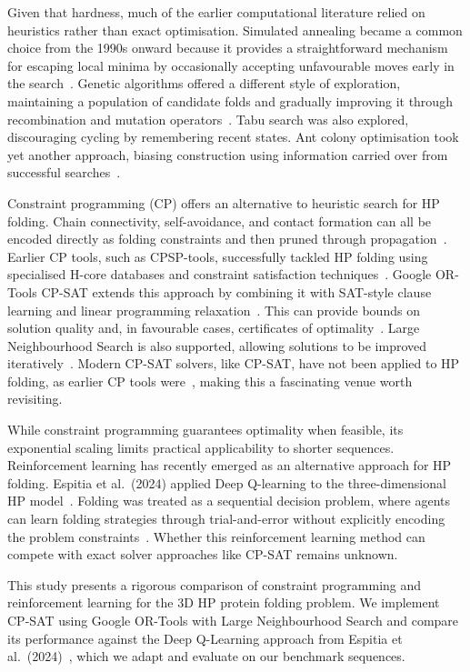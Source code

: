 \documentclass{article}
\theoremstyle{plain}
\theoremstyle{definition}
\begin{document}
Given that hardness, much of the earlier computational literature relied on heuristics rather than exact optimisation. Simulated annealing became a common choice from the 1990s onward because it provides a straightforward mechanism for escaping local minima by occasionally accepting unfavourable moves early in the search~\cite{UngerMoult1993}. Genetic algorithms offered a different style of exploration, maintaining a population of candidate folds and gradually improving it through recombination and mutation operators~\cite{Krasnogor2002Multimeme}. Tabu search was also explored, discouraging cycling by remembering recent states. Ant colony optimisation took yet another approach, biasing construction using information carried over from successful searches~\cite{LeshPullMoves2003, StützleACO2005}.

Constraint programming (CP) offers an alternative to heuristic search for HP folding. Chain connectivity, self-avoidance, and contact formation can all be encoded directly as folding constraints and then pruned through propagation~\cite{Barták2003}. Earlier CP tools, such as CPSP-tools, successfully tackled HP folding using specialised H-core databases and constraint satisfaction techniques~\cite{CPSP2009}. Google OR-Tools CP-SAT extends this approach by combining it with SAT-style clause learning and linear programming relaxation~\cite{Perron2023}. This can provide bounds on solution quality and, in favourable cases, certificates of optimality~\cite{GoogleORTools}. Large Neighbourhood Search is also supported, allowing solutions to be improved iteratively~\cite{Shaw1998}. Modern CP-SAT solvers, like CP-SAT, have not been applied to HP folding, as earlier CP tools were~\cite{CPSP2009}, making this a fascinating venue worth revisiting.

While constraint programming guarantees optimality when feasible, its exponential scaling limits practical applicability to shorter sequences. Reinforcement learning has recently emerged as an alternative approach for HP folding. Espitia et al.~(2024) applied Deep Q-learning to the three-dimensional HP model~\cite{Espitia2024}. Folding was treated as a sequential decision problem, where agents can learn folding strategies through trial-and-error without explicitly encoding the problem constraints~\cite{Yang2022}. Whether this reinforcement learning method can compete with exact solver approaches like CP-SAT remains unknown.

This study presents a rigorous comparison of constraint programming and reinforcement learning for the 3D HP protein folding problem. We implement CP-SAT using Google OR-Tools with Large Neighbourhood Search and compare its performance against the Deep Q-Learning approach from Espitia et al.~(2024)~\cite{Espitia2024}, which we adapt and evaluate on our benchmark sequences.
\end{document}
